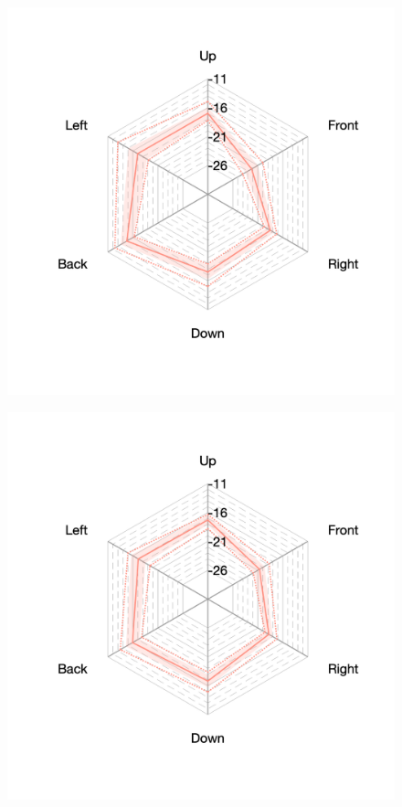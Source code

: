 \documentclass[11pt,a4j]{jreport}
\begin{document}
\begin{figure}[H]
      \begin{minipage}[b]{.33\textwidth}
        \centering
        \includegraphics[width=1\linewidth]{images/realHallDirSt/early_hall_d_allpoints.png}
        \label{fig:ホールDにおけるSTEarly}
      \end{minipage}%
      \begin{minipage}[b]{.33\textwidth}
        \centering
        \includegraphics[width=1\linewidth]{images/realHallDirSt/early_hall_e_allpoints.png}

\end{minipage}
\end{figure}
\end{document}

